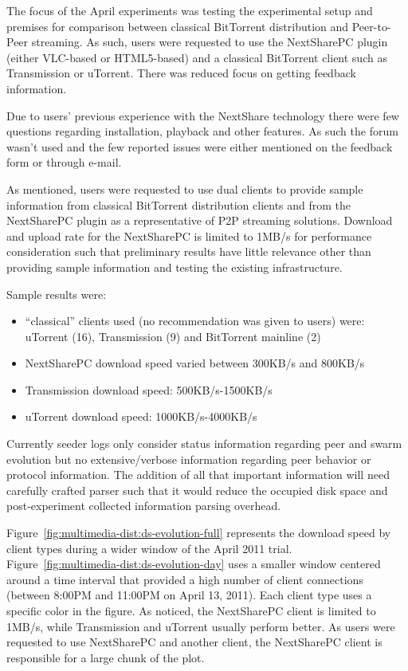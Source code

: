 The focus of the April experiments was testing the experimental setup and
premises for comparison between classical BitTorrent distribution and
Peer-to-Peer streaming. As such, users were requested to use the NextSharePC
plugin (either VLC-based or HTML5-based) and a classical BitTorrent client
such as Transmission or uTorrent. There was reduced focus on getting feedback
information.

Due to users' previous experience with the NextShare technology there were few
questions regarding installation, playback and other features. As such the
forum wasn't used and the few reported issues were either mentioned on the
feedback form or through e-mail.

As mentioned, users were requested to use dual clients to provide sample
information from classical BitTorrent distribution clients and from the
NextSharePC plugin as a representative of P2P streaming solutions. Download
and upload rate for the NextSharePC is limited to 1MB/s for performance
consideration such that preliminary results have little relevance other than
providing sample information and testing the existing infrastructure.

Sample results were:

\begin{itemize}
  \item ``classical'' clients used (no recommendation was given to users)
  were: uTorrent (16), Transmission (9) and BitTorrent mainline (2)
  \item NextSharePC download speed varied between 300KB/s and 800KB/s
  \item Transmission download speed: 500KB/s-1500KB/s
  \item uTorrent download speed: 1000KB/s-4000KB/s
\end{itemize}

Currently seeder logs only consider status information regarding peer and
swarm evolution but no extensive/verbose information regarding peer behavior
or protocol information. The addition of all that important information will
need carefully crafted parser such that it would reduce the occupied disk
space and post-experiment collected information parsing overhead.

Figure~\ref{fig:multimedia-dist:ds-evolution-full} represents the download
speed by client types during a wider window of the April 2011 trial.
Figure~\ref{fig:multimedia-dist:ds-evolution-day} uses a smaller window
centered around a time interval that provided a high number of client
connections (between 8:00PM and 11:00PM on April 13, 2011). Each client type
uses a specific color in the figure. As noticed, the NextSharePC client is
limited to 1MB/s, while Transmission and uTorrent usually perform better. As
users were requested to use NextSharePC and another client, the NextSharePC
client is responsible for a large chunk of the plot.

